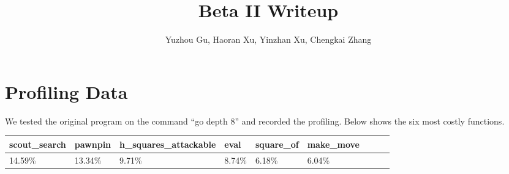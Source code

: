 \documentclass[10pt,twosidep]{article}
\begin{document}
\pagestyle{fancy}

\setlength{\parindent}{2em}
\setlength{\footskip}{30pt}
\setlength{\baselineskip}{1.3\baselineskip}

\title{Beta II Writeup}
\author{Yuzhou Gu, Haoran Xu, Yinzhan Xu, Chengkai Zhang}
\maketitle{}

\section{Profiling Data}
We tested the original program on the command ``go depth 8'' and recorded the profiling. Below shows the six most costly functions.

\begin{tabular}{ |l|l|l|l|l|l|l|l|l| }
\hline
scout\_search & pawnpin & h\_squares\_attackable & eval & square\_of & make\_move\\
\hline
14.59\% & 13.34\% & 9.71\% & 8.74\% & 6.18\% & 6.04\%\\
\hline
\end{tabular}
\end{document}
